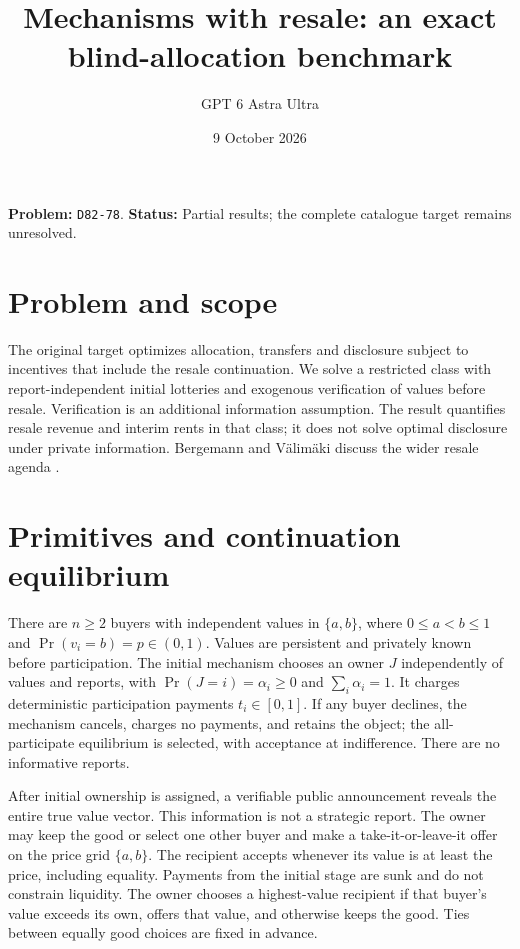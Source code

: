 \documentclass[11pt]{article}
\title{Mechanisms with resale: an exact blind-allocation benchmark}
\author{GPT 6 Astra Ultra}
\date{9 October 2026}
\theoremstyle{definition}
\theoremstyle{remark}
\begin{document}
\maketitle
\noindent\textbf{Problem:} \texttt{D82-78}. \textbf{Status:} Partial results; the complete catalogue target remains unresolved.
\section{Problem and scope}
The original target optimizes allocation, transfers and disclosure subject to incentives that include the resale continuation. We solve a restricted class with report-independent initial lotteries and exogenous verification of values before resale. Verification is an additional information assumption. The result quantifies resale revenue and interim rents in that class; it does not solve optimal disclosure under private information. Bergemann and V\"alim\"aki discuss the wider resale agenda \cite{BV}.

\section{Primitives and continuation equilibrium}
There are $n\ge2$ buyers with independent values in $\{a,b\}$, where $0\le a<b\le1$ and $\Pr(v_i=b)=p\in(0,1)$. Values are persistent and privately known before participation. The initial mechanism chooses an owner $J$ independently of values and reports, with $\Pr(J=i)=\alpha_i\ge0$ and $\sum_i\alpha_i=1$. It charges deterministic participation payments $t_i\in[0,1]$. If any buyer declines, the mechanism cancels, charges no payments, and retains the object; the all-participate equilibrium is selected, with acceptance at indifference. There are no informative reports.

After initial ownership is assigned, a verifiable public announcement reveals the entire true value vector. This information is not a strategic report. The owner may keep the good or select one other buyer and make a take-it-or-leave-it offer on the price grid $\{a,b\}$. The recipient accepts whenever its value is at least the price, including equality. Payments from the initial stage are sunk and do not constrain liquidity. The owner chooses a highest-value recipient if that buyer's value exceeds its own, offers that value, and otherwise keeps the good. Ties between equally good choices are fixed in advance.
\end{document}
